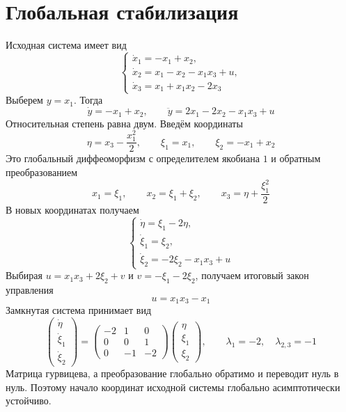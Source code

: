 \section{Глобальная стабилизация}

Исходная система имеет вид
\begin{equation}
  \begin{cases}
    \dot x_1=-x_1+x_2,\\
    \dot x_2=x_1-x_2-x_1x_3+u,\\
    \dot x_3=x_1+x_1x_2-2x_3
  \end{cases}
\end{equation}
Выберем $y=x_1$. Тогда
\begin{equation}
  \dot y=-x_1+x_2,\qquad
  \ddot y=2x_1-2x_2-x_1x_3+u
\end{equation}
Относительная степень равна двум. Введём координаты
\begin{equation}
  \eta=x_3-\frac{x_1^2}{2},\qquad
  \xi_1=x_1,\qquad \xi_2=-x_1+x_2
\end{equation}
Это глобальный диффеоморфизм с определителем якобиана $1$
и обратным преобразованием
\begin{equation}
  x_1=\xi_1,\qquad x_2=\xi_1+\xi_2,\qquad
  x_3=\eta+\frac{\xi_1^2}{2}
\end{equation}
В новых координатах получаем
\begin{equation}
  \begin{cases}
    \dot\eta=\xi_1-2\eta,\\
    \dot \xi_1=\xi_2,\\
    \dot \xi_2=-2\xi_2-x_1x_3+u
  \end{cases}
\end{equation}
Выбирая $u=x_1x_3+2\xi_2+v$ и $v=-\xi_1-2\xi_2$, получаем
итоговый закон управления
\begin{equation}
  u=x_1x_3-x_1
\end{equation}
Замкнутая система принимает вид
\begin{equation}
  \begin{pmatrix}\dot\eta\\\dot \xi_1\\\dot \xi_2\end{pmatrix}
  =\begin{pmatrix}-2&1&0\\0&0&1\\0&-1&-2\end{pmatrix}
   \begin{pmatrix}\eta\\\xi_1\\\xi_2\end{pmatrix},
  \qquad \lambda_1=-2,\quad \lambda_{2,3}=-1
\end{equation}
Матрица гурвицева, а преобразование глобально обратимо и переводит
нуль в нуль. Поэтому начало координат исходной системы глобально
асимптотически устойчиво.

